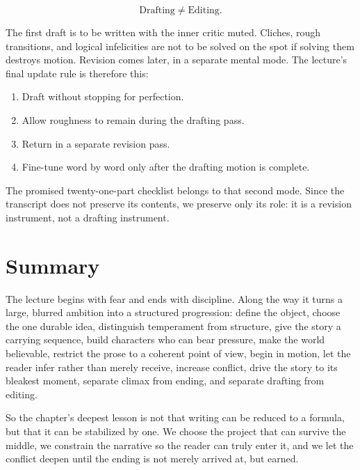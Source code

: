 \begin{equation}
\text{Drafting} \neq \text{Editing}.
\end{equation}

The first draft is to be written with the inner critic muted. Cliches, rough transitions, and logical infelicities are not to be solved on the spot if solving them destroys motion. Revision comes later, in a separate mental mode. The lecture's final update rule is therefore this:

\begin{enumerate}
\item Draft without stopping for perfection.
\item Allow roughness to remain during the drafting pass.
\item Return in a separate revision pass.
\item Fine-tune word by word only after the drafting motion is complete.
\end{enumerate}

The promised twenty-one-part checklist belongs to that second mode. Since the transcript does not preserve its contents, we preserve only its role: it is a revision instrument, not a drafting instrument.

\section{Summary}

The lecture begins with fear and ends with discipline. Along the way it turns a large, blurred ambition into a structured progression: define the object, choose the one durable idea, distinguish temperament from structure, give the story a carrying sequence, build characters who can bear pressure, make the world believable, restrict the prose to a coherent point of view, begin in motion, let the reader infer rather than merely receive, increase conflict, drive the story to its bleakest moment, separate climax from ending, and separate drafting from editing.

So the chapter's deepest lesson is not that writing can be reduced to a formula, but that it can be stabilized by one. We choose the project that can survive the middle, we constrain the narrative so the reader can truly enter it, and we let the conflict deepen until the ending is not merely arrived at, but earned.
